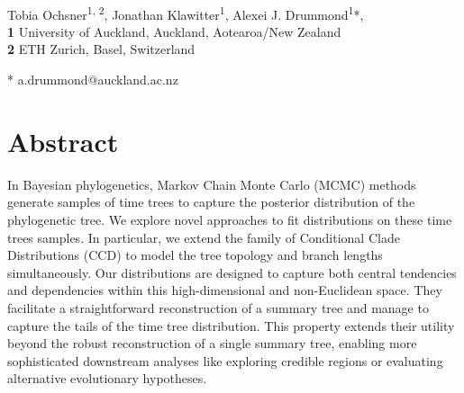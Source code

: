\documentclass[10pt,letterpaper]{article}
\begin{document}
\vspace*{0.2in}

\begin{flushleft}
{\Large
\textbf{} %
}
\newline
\\
Tobia Ochsner\textsuperscript{1, 2},
Jonathan Klawitter\textsuperscript{1},
Alexei J. Drummond\textsuperscript{1}*,
\\
\bigskip
\textbf{1} University of Auckland, Auckland, Aotearoa/New Zealand
\\
\textbf{2} ETH Zurich, Basel, Switzerland
\\
\bigskip

* a.drummond@auckland.ac.nz

\end{flushleft}
\section*{Abstract}
In Bayesian phylogenetics, Markov Chain Monte Carlo (MCMC) methods generate samples of time trees to capture the posterior distribution of the phylogenetic tree. We explore novel approaches to fit distributions on these time trees samples. In particular, we extend the family of Conditional Clade Distributions (CCD) to model the tree topology and branch lengths simultaneously. Our distributions are designed to capture both central tendencies and dependencies within this high-dimensional and non-Euclidean space. They facilitate a straightforward reconstruction of a summary tree and manage to capture the tails of the time tree distribution. This property extends their utility beyond the robust reconstruction of a single summary tree, enabling more sophisticated downstream analyses like exploring credible regions or evaluating alternative evolutionary hypotheses.


\end{document}
